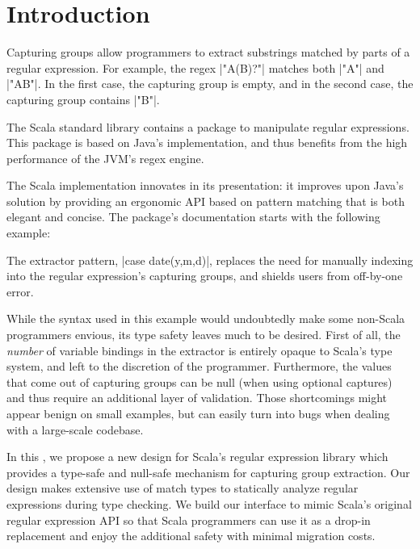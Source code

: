 \def\paper{\thesisOnly{chapter}\paperOnly{paper}}
\section{Introduction}

\begin{diff}
Capturing groups allow programmers to extract substrings matched by parts of a regular expression.
For example, the regex |"A(B)?"| matches both |"A"| and |"AB"|.
In the first case, the capturing group is empty, and in the second case, the capturing group contains |"B"|.
\end{diff}

The Scala standard library contains a package to manipulate regular expressions.
This package is based on Java's implementation, and thus benefits from the high performance of the JVM's regex engine.
\begin{diff}
The Scala implementation innovates in its presentation: it improves upon Java's solution by providing an ergonomic API based on pattern matching that is both elegant and concise.
The package's documentation starts with the following example:
\end{diff}

\regexDocumentation

\noindent
The extractor pattern, |case date(y,m,d)|, replaces the need for manually indexing into the regular expression's capturing groups, and shields users from off-by-one error.

While the syntax used in this example would undoubtedly make some non-Scala programmers envious, its type safety leaves much to be desired.
First of all, the \emph{number} of variable bindings in the extractor is entirely opaque to Scala's type system, and left to the discretion of the programmer.
Furthermore, the values that come out of capturing groups can be null (when using optional captures) and thus require an additional layer of validation.
Those shortcomings might appear benign on small examples, but can easily turn into bugs when dealing with a large-scale codebase.

In this \paper, we propose a new design for Scala's regular expression library which provides a type-safe and null-safe mechanism for capturing group extraction.
Our design makes extensive use of match types to statically analyze regular expressions during type checking.
We build our interface to mimic Scala's original regular expression API so that Scala programmers can use it as a drop-in replacement and enjoy the additional safety with minimal migration costs.

